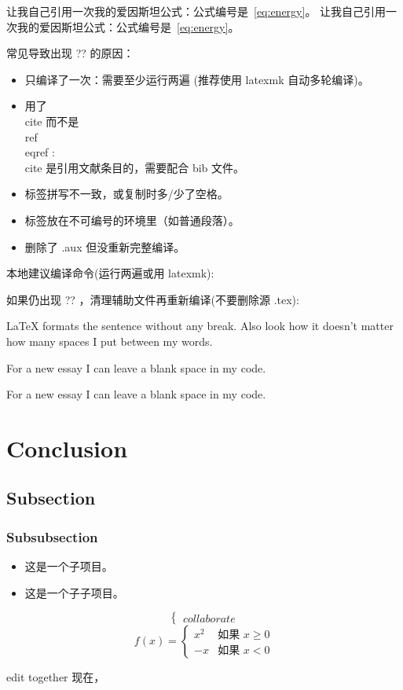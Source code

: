 \documentclass{ctexart} %
\begin{document}
让我自己引用一次我的爱因斯坦公式：公式编号是~\eqref{eq:energy}。
让我自己引用一次我的爱因斯坦公式：公式编号是~\eqref{eq:energy}。

常见导致出现 ?? 的原因：
\begin{itemize}
  \item 只编译了一次：需要至少运行两遍 (推荐使用 latexmk 自动多轮编译)。
  \item 用了 \\cite 而不是 \\ref \\eqref : \\cite 是引用文献条目的，需要配合 bib 文件。
  \item 标签拼写不一致，或复制时多/少了空格。
  \item 标签放在不可编号的环境里（如普通段落）。
  \item 删除了 .aux 但没重新完整编译。
\end{itemize}

本地建议编译命令(运行两遍或用 latexmk):

如果仍出现 ?? ，清理辅助文件再重新编译(不要删除源 .tex):

\LaTeX{} formats the sentence without any break.  Also look how it doesn't matter how many spaces I put between my words.

For a new essay I can leave a blank space in my code.

For a new essay I can leave a blank space in my code.

\section{Conclusion} %

\subsection{Subsection} %
\subsubsection{Subsubsection} %
\begin{itemize}
  \item 这是一个子项目。
  \item 这是一个子子项目。

\end{itemize}

\[\begin{cases}
  collaborate
\end{cases} \]
\[
f(x) = \begin{cases} 
x^2 & \text{如果 } x \geq 0 \\
-x & \text{如果 } x < 0 
\end{cases}
\]


edit together
现在，
\end{document}
